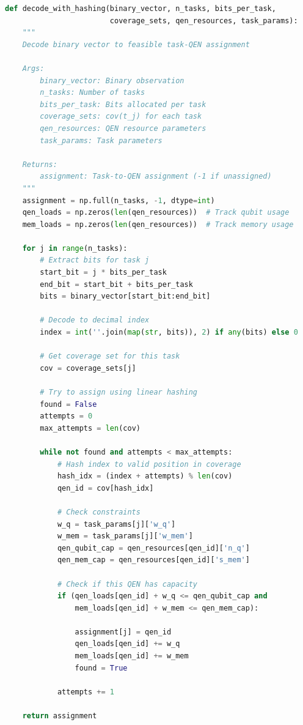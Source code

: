 \documentclass[12pt,a4paper]{article}
\begin{document}
\begin{lstlisting}[language=Python, caption=Hashing-Based Decoding]
def decode_with_hashing(binary_vector, n_tasks, bits_per_task, 
                        coverage_sets, qen_resources, task_params):
    """
    Decode binary vector to feasible task-QEN assignment
    
    Args:
        binary_vector: Binary observation
        n_tasks: Number of tasks
        bits_per_task: Bits allocated per task
        coverage_sets: cov(t_j) for each task
        qen_resources: QEN resource parameters
        task_params: Task parameters
    
    Returns:
        assignment: Task-to-QEN assignment (-1 if unassigned)
    """
    assignment = np.full(n_tasks, -1, dtype=int)
    qen_loads = np.zeros(len(qen_resources))  # Track qubit usage
    mem_loads = np.zeros(len(qen_resources))  # Track memory usage
    
    for j in range(n_tasks):
        # Extract bits for task j
        start_bit = j * bits_per_task
        end_bit = start_bit + bits_per_task
        bits = binary_vector[start_bit:end_bit]
        
        # Decode to decimal index
        index = int(''.join(map(str, bits)), 2) if any(bits) else 0
        
        # Get coverage set for this task
        cov = coverage_sets[j]
        
        # Try to assign using linear hashing
        found = False
        attempts = 0
        max_attempts = len(cov)
        
        while not found and attempts < max_attempts:
            # Hash index to valid position in coverage
            hash_idx = (index + attempts) % len(cov)
            qen_id = cov[hash_idx]
            
            # Check constraints
            w_q = task_params[j]['w_q']
            w_mem = task_params[j]['w_mem']
            qen_qubit_cap = qen_resources[qen_id]['n_q']
            qen_mem_cap = qen_resources[qen_id]['s_mem']
            
            # Check if this QEN has capacity
            if (qen_loads[qen_id] + w_q <= qen_qubit_cap and
                mem_loads[qen_id] + w_mem <= qen_mem_cap):
                
                assignment[j] = qen_id
                qen_loads[qen_id] += w_q
                mem_loads[qen_id] += w_mem
                found = True
            
            attempts += 1
    
    return assignment
\end{lstlisting}
\end{document}
